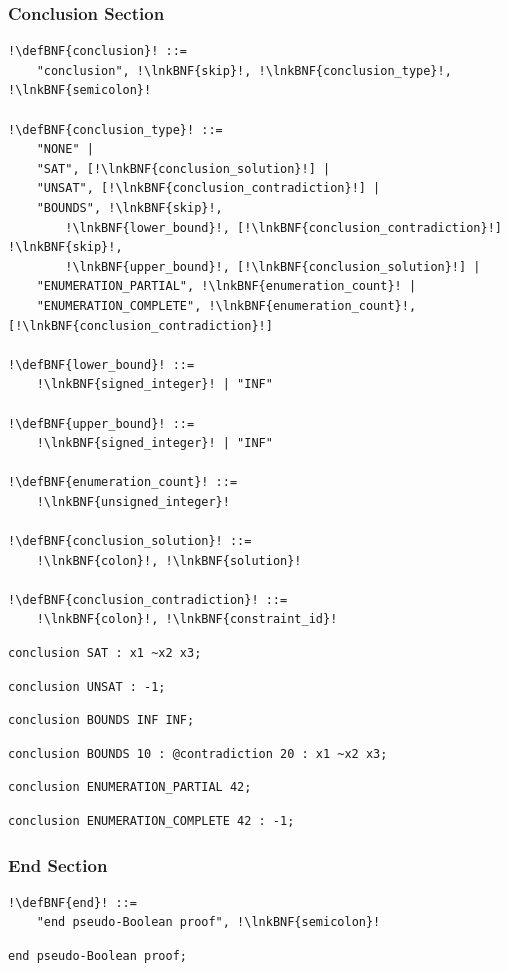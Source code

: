 \documentclass[a4paper]{article}
\newcommand{\defBNF}[1]{\hypertarget{def:#1}{<\detokenize{#1}>}}
\newcommand{\lnkBNF}[1]{\hyperlink{def:#1}{<\detokenize{#1}>}}
\begin{document}
\subsubsection{Conclusion Section}\label{sec:footer-conclusion}
\begin{lstlisting}
!\defBNF{conclusion}! ::=
	"conclusion", !\lnkBNF{skip}!, !\lnkBNF{conclusion_type}!, !\lnkBNF{semicolon}!

!\defBNF{conclusion_type}! ::=
	"NONE" |
	"SAT", [!\lnkBNF{conclusion_solution}!] |
	"UNSAT", [!\lnkBNF{conclusion_contradiction}!] |
	"BOUNDS", !\lnkBNF{skip}!,
		!\lnkBNF{lower_bound}!, [!\lnkBNF{conclusion_contradiction}!] !\lnkBNF{skip}!,
		!\lnkBNF{upper_bound}!, [!\lnkBNF{conclusion_solution}!] |
	"ENUMERATION_PARTIAL", !\lnkBNF{enumeration_count}! |
	"ENUMERATION_COMPLETE", !\lnkBNF{enumeration_count}!, [!\lnkBNF{conclusion_contradiction}!]

!\defBNF{lower_bound}! ::=
	!\lnkBNF{signed_integer}! | "INF"

!\defBNF{upper_bound}! ::=
	!\lnkBNF{signed_integer}! | "INF"

!\defBNF{enumeration_count}! ::=
    !\lnkBNF{unsigned_integer}!

!\defBNF{conclusion_solution}! ::=
	!\lnkBNF{colon}!, !\lnkBNF{solution}!

!\defBNF{conclusion_contradiction}! ::=
	!\lnkBNF{colon}!, !\lnkBNF{constraint_id}!
\end{lstlisting}
\begin{lstlisting}[language=veripb]
conclusion SAT : x1 ~x2 x3;
\end{lstlisting}
\begin{lstlisting}[language=veripb]
conclusion UNSAT : -1;
\end{lstlisting}
\begin{lstlisting}[language=veripb]
conclusion BOUNDS INF INF;
\end{lstlisting}
\begin{lstlisting}[language=veripb]
conclusion BOUNDS 10 : @contradiction 20 : x1 ~x2 x3;
\end{lstlisting}
\begin{lstlisting}[language=veripb]
conclusion ENUMERATION_PARTIAL 42;
\end{lstlisting}
\begin{lstlisting}[language=veripb]
conclusion ENUMERATION_COMPLETE 42 : -1;
\end{lstlisting}


\subsubsection{End Section}\label{sec:footer-end}
\begin{lstlisting}
!\defBNF{end}! ::=
	"end pseudo-Boolean proof", !\lnkBNF{semicolon}!
\end{lstlisting}
\begin{lstlisting}[language=veripb]
end pseudo-Boolean proof;
\end{lstlisting}
\end{document}
